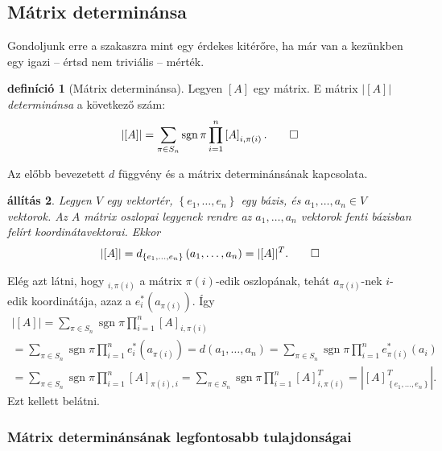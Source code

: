 \documentclass[9pt, a4paper, showtrims]{memoir}
\makeatletter
\renewenvironment{proof}[1][\proofname]
    {\par\pushQED{\qed}%
    \normalfont \topsep6\p@\@plus6\p@\relax
    \trivlist
    \item[\hskip\labelsep
        \itshape
    #1\@addpunct{:}]\ignorespaces}
    {\popQED\endtrivlist\@endpefalse}
\theoremstyle{plain}
\newtheorem{proposition}{állítás}[chapter]
\theoremstyle{remark}
\theoremstyle{definition}
\newtheorem{definition}[proposition]{definíció}
\DeclareMathOperator{\sgn}{sgn}
\makeatother
\begin{document}
\subsection{Mátrix determinánsa}
Gondoljunk erre a szakaszra mint egy érdekes kitérőre,
ha már van a kezünkben egy igazi -- értsd nem triviális -- mérték.
\begin{definition}[Mátrix determinánsa]
	Legyen
	$\left[ A\right]$ egy mátrix.
	E mátrix $\left| \left[ A\right] \right|$ \emph{determinánsa} a következő szám:
	\[
		\left| \left[ A\right] \right|
		=
		\sum_{\pi \in S_{n}}\sgn\pi\prod_{i=1}^n\left[ A\right]_{i,\pi \left( i\right) }.\qedhere
	\]
\end{definition}
Az előbb bevezetett $d$ függvény és a mátrix determinánsának kapcsolata.
\begin{proposition}
	Legyen $V$ egy vektortér,  $\left\{ e_1,\ldots,e_n \right\}$ egy bázis,
	és $a_1,\ldots,a_n\in V$ vektorok.
	Az $A$ mátrix oszlopai legyenek rendre az
	$a_1,\ldots,a_n$ vektorok fenti bázisban felírt koordinátavektorai.
	Ekkor
	\[
		|[A]|
		=
		d_{\left\{e_1,\ldots,e_n \right\}}\left( a_1,\ldots,a_n \right)
		=
		|[A]|^T.\qedhere
	\]
\end{proposition}
\begin{proof}
	Elég azt látni, hogy
	\begin{math}
		[A]_{i,\pi(i)}
	\end{math}
	a mátrix $\pi(i)$-edik oszlopának, tehát $a_{\pi(i)}$-nek $i$-edik koordinátája, azaz
	a
	\begin{math}
		e_i^\ast\left( a_{\pi(i)} \right).
	\end{math}
	Így
	\begin{multline*}
		|[A]|
		=
		\sum_{\pi \in S_{n}}\sgn\pi\prod_{i=1}^n\left[ A\right]_{i,\pi \left( i\right) }
		\\
		=
		\sum_{\pi \in S_{n}}\sgn\pi\prod_{i=1}^ne_i^\ast\left( a_{\pi(i)} \right)
		=
		d\left( a_1,\ldots,a_n \right)
		=
		\sum_{\pi \in S_{n}}\sgn\pi\prod_{i=1}^ne_{\pi(i)}^\ast\left( a_i \right)
		\\
		=
		\sum_{\pi \in S_{n}}\sgn\pi\prod_{i=1}^n\left[ A\right]_{\pi \left( i\right),i }
		=
		\sum_{\pi \in S_{n}}\sgn\pi\prod_{i=1}^n\left[ A\right]^T_{i,\pi \left( i\right)}
		=
		|[A]^T_{\left\{e_1,\ldots,e_n \right\}}|.
	\end{multline*}
	Ezt kellett belátni.
\end{proof}

\subsubsection{Mátrix determinánsának legfontosabb tulajdonságai}
\end{document}

